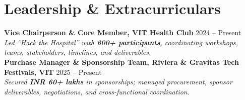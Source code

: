 \documentclass[a4paper,10pt]{article}
\begin{document}
\section{Leadership \& Extracurriculars}
\textbf{Vice Chairperson \& Core Member, VIT Health Club} \hfill \textcolor{dategray}{2024 -- Present} \\
\textit{Led ``Hack the Hospital'' with \textbf{600+ participants}, coordinating workshops, teams, stakeholders, timelines, and deliverables.} \\[2pt]
\textbf{Purchase Manager \& Sponsorship Team, Riviera \& Gravitas Tech Festivals, VIT} \hfill \textcolor{dategray}{2025 -- Present} \\
\textit{Secured \textbf{INR 60+ lakhs} in sponsorships; managed procurement, sponsor deliverables, negotiations, and cross-functional coordination.}
\end{document}
